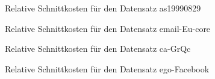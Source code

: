 \begin{figure}[t]
    \centering
    
    \caption{Relative Schnittkosten für den Datensatz as19990829\label{fig:as}}
\end{figure}


\begin{figure}
    \centering
    
    \caption{Relative Schnittkosten für den Datensatz email-Eu-core\label{fig:email}}
\end{figure}

\begin{figure}
    \centering
    
    \caption{Relative Schnittkosten für den Datensatz ca-GrQc\label{fig:cagrqc}}
\end{figure}

\begin{figure}
    \centering
    
    \caption{Relative Schnittkosten für den Datensatz ego-Facebook\label{fig:facebook}}
\end{figure}

